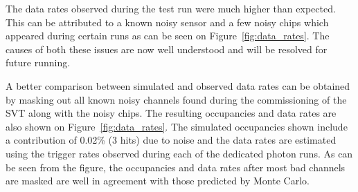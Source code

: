 %
The data rates observed during the test run were
much higher than expected.  This can be attributed to a known
noisy sensor and a few noisy chips which appeared during certain runs as can be seen
on Figure~\ref{fig:data_rates}.  The causes
of both these issues are now well understood and will be resolved for future running.

A better comparison between simulated and observed data rates can be obtained
by masking out all known noisy channels found during the commissioning of the 
SVT along with the noisy chips.  The resulting occupancies and data rates are also shown on 
Figure~\ref{fig:data_rates}. The simulated occupancies shown include a contribution
of 0.02\% (3 hits) due to noise and the data rates are estimated using the trigger
rates observed during each of the dedicated photon runs.  As can be seen from the
figure, the occupancies and data rates after most bad channels are masked are well
in agreement with those predicted by Monte Carlo.
